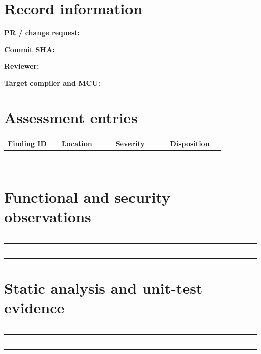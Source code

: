 \documentclass[10pt,letterpaper]{article}
\begin{document}
\makedoctitle
\makedocsummary
\section{Record information}
\noindent\textbf{PR / change request:}\quad\hrulefill\par\vspace{11pt}
\noindent\textbf{Commit SHA:}\quad\hrulefill\par\vspace{11pt}
\noindent\textbf{Reviewer:}\quad\hrulefill\par\vspace{11pt}
\noindent\textbf{Target compiler and MCU:}\quad\hrulefill\par\vspace{11pt}
\section{Assessment entries}
\begin{longtable}{|p{0.215\linewidth}|p{0.215\linewidth}|p{0.215\linewidth}|p{0.215\linewidth}|}
\hline
\textbf{Finding ID} & \textbf{Location} & \textbf{Severity} & \textbf{Disposition}\\\hline
\endhead
\rule{0pt}{27pt} & & & \\\hline
\rule{0pt}{27pt} & & & \\\hline
\rule{0pt}{27pt} & & & \\\hline
\rule{0pt}{27pt} & & & \\\hline
\rule{0pt}{27pt} & & & \\\hline
\rule{0pt}{27pt} & & & \\\hline
\end{longtable}
\section{Functional and security observations}
\noindent\rule{\linewidth}{0.4pt}\par\vspace{16pt}
\noindent\rule{\linewidth}{0.4pt}\par\vspace{16pt}
\noindent\rule{\linewidth}{0.4pt}\par\vspace{16pt}
\noindent\rule{\linewidth}{0.4pt}\par\vspace{16pt}
\section{Static analysis and unit-test evidence}
\noindent\rule{\linewidth}{0.4pt}\par\vspace{16pt}
\noindent\rule{\linewidth}{0.4pt}\par\vspace{16pt}
\noindent\rule{\linewidth}{0.4pt}\par\vspace{16pt}
\noindent\rule{\linewidth}{0.4pt}\par\vspace{16pt}
\end{document}
